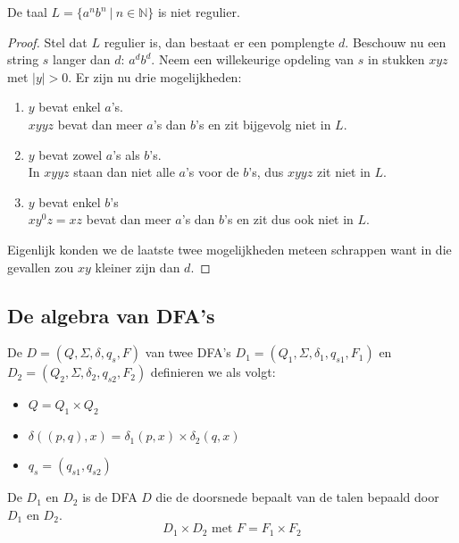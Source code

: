 \documentclass[main.tex]{subfiles}
\begin{document}
\begin{st}
\label{st:an-bn-niet-regulier-pompend-lemma}
  De taal $L= \{ a^{n}b^{n} \ |\ n\in \mathbb{N} \} $ is niet regulier.

  \begin{proof}
    Stel dat $L$ regulier is, dan bestaat er een pomplengte $d$.
    Beschouw nu een string $s$ langer dan $d$: $a^{d}b^{d}$.
    Neem een willekeurige opdeling van $s$ in stukken $xyz$ met $|y| > 0$.
    Er zijn nu drie mogelijkheden:
    \begin{enumerate}
    \item $y$ bevat enkel $a$'s.\\
      $xyyz$ bevat dan meer $a$'s dan $b$'s en zit bijgevolg niet in $L$.
    \item $y$ bevat zowel $a$'s als $b$'s.\\
      In $xyyz$ staan dan niet alle $a$'s voor de $b$'s, dus $xyyz$ zit niet in $L$.
    \item $y$ bevat enkel $b$'s\\
      $xy^{0}z = xz$ bevat dan meer $a$'s dan $b$'s en zit dus ook niet in $L$.
    \end{enumerate}
    Eigenlijk konden we de laatste twee mogelijkheden meteen schrappen want in die gevallen zou $xy$ kleiner zijn dan $d$.
  \end{proof}
\end{st}

\subsection{De algebra van DFA's}
\label{sec:de-algebra-van-DFAs}

\begin{de}
  De  $D = (Q,\Sigma, \delta, q_{s},F)$ van twee DFA's $D_{1} = (Q_{1},\Sigma, \delta_{1}, q_{s1},F_{1})$ en $D_{2} = (Q_{2},\Sigma, \delta_{2}, q_{s2},F_{2})$ definieren we als volgt:
  \begin{itemize}
  \item $Q = Q_{1}\times Q_{2}$
  \item $\delta((p, q),x) = \delta_{1}(p,x) \times \delta_{2}(q,x)$
  \item $q_{s} = (q_{s1}, q_{s2})$
  \end{itemize}
\end{de}

\begin{de}
  De  $D_{1}$ en $D_{2}$ is de DFA $D$ die de doorsnede bepaalt van de talen bepaald door $D_{1}$ en $D_{2}$.
  \[ D_{1} \times D_{2} \text{ met } F = F_{1} \times F_{2} \]
\end{de}
\end{document}
